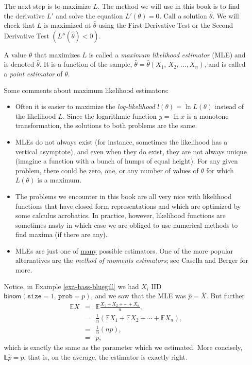 \documentclass[captions=tableheading]{scrbook}
\begin{document}
The next step is to maximize \(L\). The method we will use in this book is to find the derivative \(L'\) and solve the equation \(L'(\theta)=0\). Call a solution \(\hat{\theta}\). We will check that \(L\) is maximized at \(\hat{\theta}\) using the First Derivative Test or the Second Derivative Test \(\left(L''(\hat{\theta})<0\right)\).

\begin{defn}
A value \(\theta\) that maximizes \(L\) is called a \emph{maximum likelihood estimator} (MLE) and is denoted \(\hat{\theta}\). It is a function of the sample, \(\hat{\theta}=\hat{\theta}\left(X_{1},\, X_{2},\,\ldots,X_{n}\right)\), and is called a \emph{point estimator} of \(\theta\).
\end{defn}

\begin{rem}
Some comments about maximum likelihood estimators:
\begin{itemize}
\item Often it is easier to maximize the \emph{log-likelihood} \(l(\theta)=\ln L(\theta)\) instead of the likelihood \(L\). Since the logarithmic function \(y=\ln x\) is a monotone transformation, the solutions to both problems are the same.
\item MLEs do not always exist (for instance, sometimes the likelihood has a vertical asymptote), and even when they do exist, they are not always unique (imagine a function with a bunch of humps of equal height). For any given problem, there could be zero, one, or any number of values of \(\theta\) for which \(L(\theta)\) is a maximum.
\item The problems we encounter in this book are all very nice with likelihood functions that have closed form representations and which are optimized by some calculus acrobatics. In practice, however, likelihood functions are sometimes nasty in which case we are obliged to use numerical methods to find maxima (if there are any).
\item MLEs are just one of \underline{many} possible estimators. One of the more popular alternatives are the \emph{method of moments estimators}; see Casella and Berger \cite{Casella2002} for more.
\end{itemize}

\end{rem}

Notice, in Example \ref{exa-bass-bluegill} we had \(X_{i}\) IID \(\mathsf{binom}(\mathtt{size}=1,\,\mathtt{prob}=p)\), and we saw that the MLE was \(\hat{p}=\overline{X}\). But further
\begin{eqnarray*}
\mathbb{E}\overline{X} & = & \mathbb{E}\frac{X_{1}+X_{2}+\cdots+X_{n}}{n},\\
 & = & \frac{1}{n}\left(\mathbb{E} X_{1}+\mathbb{E} X_{2}+\cdots+\mathbb{E} X_{n}\right),\\
 & = & \frac{1}{n}\left(np\right),\\
 & = & p,
\end{eqnarray*}
which is exactly the same as the parameter which we estimated. More concisely, \(\mathbb{E}\hat{p}=p\), that is, on the average, the estimator is exactly right.
\end{document}
